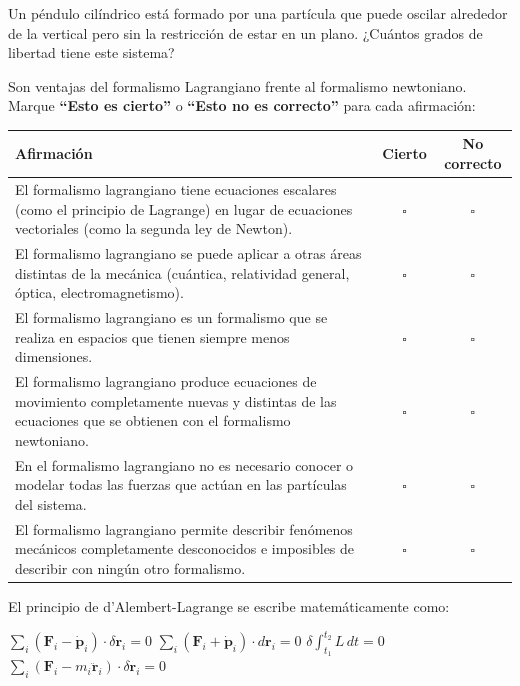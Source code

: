 \documentclass[12pt,addpoints]{exam}
\begin{document}
\begin{questions}
\question Un péndulo cilíndrico está formado por una partícula que puede oscilar alrededor de la vertical pero sin la restricción de estar en un plano. ¿Cuántos grados de libertad tiene este sistema?
\begin{choices}
\end{choices}

\question Son ventajas del formalismo Lagrangiano frente al formalismo newtoniano. Marque \textbf{``Esto es cierto''} o \textbf{``Esto no es correcto''} para cada afirmación:
\begin{center}
\begin{tabular}{p{} c c}
\toprule
\textbf{Afirmación} & \textbf{Cierto} & \textbf{No correcto} \\
\midrule
El formalismo lagrangiano tiene ecuaciones escalares (como el principio de Lagrange) en lugar de ecuaciones vectoriales (como la segunda ley de Newton). & $\square$ & $\square$ \\
El formalismo lagrangiano se puede aplicar a otras áreas distintas de la mecánica (cuántica, relatividad general, óptica, electromagnetismo). & $\square$ & $\square$ \\
El formalismo lagrangiano es un formalismo que se realiza en espacios que tienen siempre menos dimensiones. & $\square$ & $\square$ \\
El formalismo lagrangiano produce ecuaciones de movimiento completamente nuevas y distintas de las ecuaciones que se obtienen con el formalismo newtoniano. & $\square$ & $\square$ \\
En el formalismo lagrangiano no es necesario conocer o modelar todas las fuerzas que actúan en las partículas del sistema. & $\square$ & $\square$ \\
El formalismo lagrangiano permite describir fenómenos mecánicos completamente desconocidos e imposibles de describir con ningún otro formalismo. & $\square$ & $\square$ \\
\bottomrule
\end{tabular}
\end{center}

\question El principio de d'Alembert-Lagrange se escribe matemáticamente como:
\begin{choices}
\choice $\sum_i (\mathbf{F}_i - \dot{\mathbf{p}}_i) \cdot \delta \mathbf{r}_i = 0$
\choice $\sum_i (\mathbf{F}_i + \dot{\mathbf{p}}_i) \cdot d\mathbf{r}_i = 0$
\choice $\delta \int_{t_1}^{t_2} L \, dt = 0$
\choice $\sum_i (\mathbf{F}_i - m_i \ddot{\mathbf{r}}_i) \cdot \delta \mathbf{r}_i = 0$
\end{choices}


\end{questions}
\end{document}
